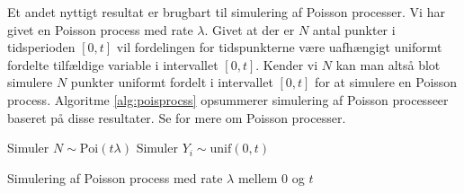 Et andet nyttigt resultat er brugbart til simulering af Poisson processer. Vi har givet en Poisson process med rate $\lambda$. Givet at der er $N$ antal punkter i tidsperioden $[0,t]$ vil fordelingen for tidspunkterne være uafhængigt uniformt fordelte tilfældige variable i intervallet $[0,t]$. Kender vi $N$ kan man altså blot simulere $N$ punkter uniformt fordelt i intervallet $[0,t]$ for at simulere en Poisson process. Algoritme \ref{alg:poisprocss} opsummerer simulering af Poisson processeer baseret på disse resultater. Se \cite[240-247]{olofsson2012} for mere om Poisson processer. 
\begin{algorithm}
\begin{algorithmic}
\STATE Simuler $N \sim \text{Poi}(t\lambda)$ 
\STATE Simuler $Y_i \sim \text{unif}(0,t)$ 
\ENDFOR 
\end{algorithmic}
\caption{Simulering af Poisson process med rate $\lambda$ mellem $0$ og $t$} \label{alg:poisprocss}
\end{algorithm}